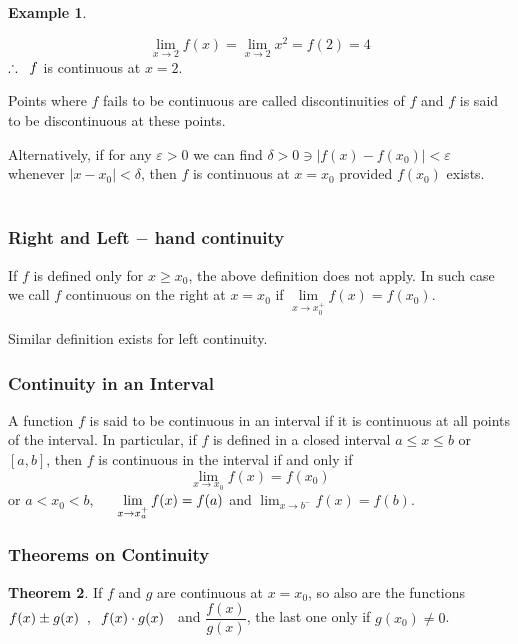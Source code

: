 \documentclass[11pt,a4paper]{article}
\theoremstyle{definition}
\newtheorem{thm}{Theorem}[subsection]
\newtheorem{exa}[thm]{Example}
\begin{document}
\begin{exa}
\begin{enumerate}
$$\lim_{x\rightarrow 2} f(x) = \lim_{x\rightarrow 2}x^2 = f(2)  = 4$$
$\therefore\hspace{0.2cm}f$ is continuous at $x = 2$.
\end{enumerate}

Points where $f$ fails to be continuous are called discontinuities of $f$ and $f$ is said to be discontinuous at these points.


Alternatively, if for any $\varepsilon > 0$ we can find $\delta > 0 \ni \left|f(x) - f(x_0)\right| < \varepsilon$ whenever $\left|x - x_0\right| < \delta$, then $f$ is continuous at $x = x_0$ provided $f(x_0)$ exists.\\\\
\end{exa}

\subsubsection{Right and Left $-$ hand continuity}
If $f$ is defined only for $x\geq x_0$, the above definition does not apply. In such case we call $f$ continuous on the right at $x = x_0$ if $\displaystyle{\lim\limits_{x \rightarrow x_0^+}f(x) = f(x_0)}$.


Similar definition exists for left continuity.


\subsubsection{Continuity in an Interval}
A function $f$ is said to be continuous in an interval if it is continuous at all points of the interval. In particular, if $f$ is defined in a closed interval $a \leq x \leq b$ or $[a,b]$, then $f$ is continuous in the interval if and only if $$\displaystyle{\lim_{x \rightarrow x_0} f(x) = f(x_0)}$$ or $a< x_0 < b,$ $\hspace{0.4cm} \displaystyle{\lim_{x \rightarrow x_a^+} f(x) = f(a)}$ and $\displaystyle{\lim_{x \rightarrow b^-} f(x) = f(b)}$.


\subsubsection{Theorems on Continuity}

\begin{thm}


If $f$ and $g$ are continuous at $x = x_0$, so also are the functions $f(x) \pm g(x) \hspace{0.2cm} , \hspace{0.2cm} f(x)\cdot g(x) \hspace{0.2cm}$ and $\dfrac{f(x)}{g(x)}$, the last one only if $g(x_0) \neq 0$.
\end{thm}
\end{document}
